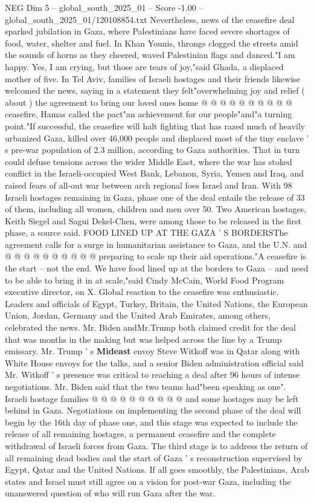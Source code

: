 \begin{textsample}{NEG Dim 5 – global\_south\_2025\_01 – Score -1.00 – global\_south\_2025\_01/120108854.txt}
Nevertheless, news of the ceasefire deal sparked jubilation in Gaza, where Palestinians have faced severe shortages of food, water, shelter and fuel.
In Khan Younis, throngs clogged the streets amid the sounds of horns as they cheered, waved Palestinian flags and danced."I am happy.
Yes, I am crying, but those are tears of joy,"said Ghada, a displaced mother of five.
In Tel Aviv, families of Israeli hostages and their friends likewise welcomed the news, saying in a statement they felt"overwhelming joy and relief ( about ) the agreement to bring our loved ones home @ @ @ @ @ @ @ @ @ @ ceasefire, Hamas called the pact"an achievement for our people"and"a turning point."If successful, the ceasefire will halt fighting that has razed much of heavily urbanized Gaza, killed over 46,000 people and displaced most of the tiny enclave ' s pre-war population of 2.3 million, according to Gaza authorities.
That in turn could defuse tensions across the wider Middle East, where the war has stoked conflict in the Israeli-occupied West Bank, Lebanon, Syria, Yemen and Iraq, and raised fears of all-out war between arch regional foes Israel and Iran.
With 98 Israeli hostages remaining in Gaza, phase one of the deal entails the release of 33 of them, including all women, children and men over 50.
Two American hostages, Keith Siegel and Sagui Dekel-Chen, were among those to be released in the first phase, a source said.
FOOD LINED UP AT THE GAZA ' S BORDERSThe agreement calls for a surge in humanitarian assistance to Gaza, and the U.N. and @ @ @ @ @ @ @ @ @ @ preparing to scale up their aid operations."A ceasefire is the start -- not the end.
We have food lined up at the borders to Gaza -- and need to be able to bring it in at scale,"said Cindy McCain, World Food Program executive director, on X.
Global reaction to the ceasefire was enthusiastic.
Leaders and officials of Egypt, Turkey, Britain, the United Nations, the European Union, Jordan, Germany and the United Arab Emirates, among others, celebrated the news.
Mr.
Biden andMr.Trump both claimed credit for the deal that was months in the making but was helped across the line by a Trump emissary.
Mr.
Trump ' s \textbf{Mideast} envoy Steve Witkoff was in Qatar along with White House envoys for the talks, and a senior Biden administration official said Mr.
Witkoff ' s presence was critical to reaching a deal after 96 hours of intense negotiations.
Mr.
Biden said that the two teams had"been speaking as one".
Israeli hostage families @ @ @ @ @ @ @ @ @ @ and some hostages may be left behind in Gaza.
Negotiations on implementing the second phase of the deal will begin by the 16th day of phase one, and this stage was expected to include the release of all remaining hostages, a permanent ceasefire and the complete withdrawal of Israeli forces from Gaza.
The third stage is to address the return of all remaining dead bodies and the start of Gaza ' s reconstruction supervised by Egypt, Qatar and the United Nations.
If all goes smoothly, the Palestinians, Arab states and Israel must still agree on a vision for post-war Gaza, including the unanswered question of who will run Gaza after the war.

\end{textsample}
